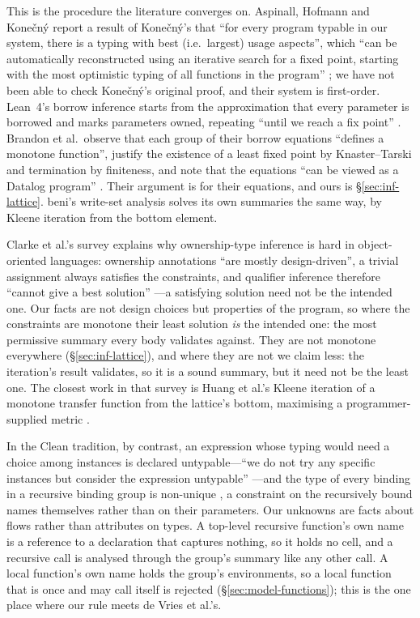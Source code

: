 This is the procedure the literature converges on. Aspinall, Hofmann and Kone\v{c}n\'y report a
result of Kone\v{c}n\'y's \citep{konecny2003typing} that ``for every program typable in our system,
there is a typing with best (i.e.\ largest) usage aspects'', which ``can be automatically
reconstructed using an iterative search for a fixed point, starting with the most optimistic typing
of all functions in the program'' \citep[\S6.2]{aspinall2008usage}; we have not been able to check
Kone\v{c}n\'y's original proof, and their system is first-order. Lean~4's borrow inference starts from
the approximation that every parameter is borrowed and marks parameters owned, repeating ``until we
reach a fix point'' \citep[\S5.2]{ullrich2019beans}. Brandon et al.\ observe that each group of their
borrow equations ``defines a monotone function'', justify the existence of a least fixed point by
Knaster--Tarski and termination by finiteness, and note that the equations ``can be viewed as a
Datalog program'' \citep[\S4.4]{brandon2026borrows}. Their argument is for their equations, and ours is
\S\ref{sec:inf-lattice}. beni's write-set analysis solves its own summaries the same way, by Kleene
iteration from the bottom element.

Clarke et al.'s survey explains why ownership-type inference is hard in object-oriented languages:
ownership annotations ``are mostly design-driven'', a trivial assignment always satisfies the
constraints, and qualifier inference therefore ``cannot give a best solution''
\citep[\S5]{clarke2013survey}---a satisfying solution need not be the intended one. Our facts are not
design choices but properties of the program, so where the constraints are monotone their least solution
\emph{is} the intended one: the most permissive summary every body validates against. They are not
monotone everywhere (\S\ref{sec:inf-lattice}), and where they are not we claim less: the iteration's
result validates, so it is a sound summary, but it need not be the least one. The
closest work in that survey is Huang et al.'s Kleene iteration of a monotone transfer function from the
lattice's bottom, maximising a programmer-supplied metric \citep[\S5.2]{clarke2013survey}.

In the Clean tradition, by contrast, an expression whose typing would need a choice among instances
is declared untypable---``we do not try any specific instances but consider the expression
untypable'' \citep[\S8]{barendsen1996uniqueness}---and the type of every binding in a recursive binding
group is non-unique \citep[\S7]{devries2008simplified}, a constraint on the recursively bound names
themselves rather than on their parameters. Our unknowns are facts about flows rather than attributes
on types. A top-level recursive function's own name is a reference to a declaration that captures
nothing, so it holds no cell, and a recursive call is analysed through the group's summary like any
other call. A local function's own name holds the group's environments, so a local function that is
once and may call itself is rejected (\S\ref{sec:model-functions}); this is the one place where our
rule meets de Vries et al.'s.

